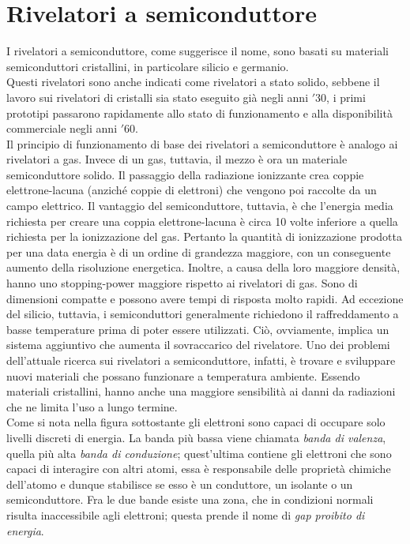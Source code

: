 \documentclass[12pt, letterpaper]{book}
\begin{document}
\chapter{Rivelatori a semiconduttore}
I rivelatori a semiconduttore, come suggerisce il nome, sono basati su materiali semiconduttori cristallini, in particolare silicio e germanio.\\
Questi rivelatori sono anche indicati come rivelatori a stato solido, sebbene il lavoro sui rivelatori di cristalli sia stato eseguito già negli anni $'30$, i primi prototipi passarono rapidamente allo stato di funzionamento e alla disponibilità commerciale negli anni $'60$.\\
Il principio di funzionamento di base dei rivelatori a semiconduttore è analogo ai rivelatori a gas. Invece di un gas, tuttavia, il mezzo è ora un materiale semiconduttore solido. Il passaggio della radiazione ionizzante crea coppie elettrone-lacuna (anziché coppie di elettroni) che vengono poi raccolte da un campo elettrico. Il vantaggio del semiconduttore, tuttavia, è che l'energia media richiesta per creare una coppia elettrone-lacuna è circa 10 volte inferiore a quella richiesta per la ionizzazione del gas. Pertanto la quantità di ionizzazione prodotta per una data energia è di un ordine di grandezza maggiore, con un conseguente aumento della risoluzione energetica. Inoltre, a causa della loro maggiore densità, hanno uno stopping-power maggiore rispetto ai rivelatori di gas. Sono di dimensioni compatte e possono avere tempi di risposta molto rapidi. Ad eccezione del silicio, tuttavia, i semiconduttori generalmente richiedono il raffreddamento a basse temperature prima di poter essere utilizzati. Ciò, ovviamente, implica un sistema aggiuntivo che aumenta il sovraccarico del rivelatore. Uno dei problemi dell'attuale ricerca sui rivelatori a semiconduttore, infatti, è trovare e sviluppare nuovi materiali che possano funzionare a temperatura ambiente. Essendo materiali cristallini, hanno anche una maggiore sensibilità ai danni da radiazioni che ne limita l'uso a lungo termine.\\
Come si nota nella figura sottostante gli elettroni sono capaci di occupare solo livelli discreti di energia. La banda più bassa viene chiamata \textit{banda di valenza}, quella più alta \textit{banda di conduzione}; quest'ultima contiene gli elettroni che sono capaci di interagire con altri atomi, essa è responsabile delle proprietà chimiche dell'atomo e dunque stabilisce se esso è un conduttore, un isolante o un semiconduttore. Fra le due bande esiste una zona, che in condizioni normali risulta inaccessibile agli elettroni; questa prende il nome di \textit{gap proibito di energia}.
\end{document}
